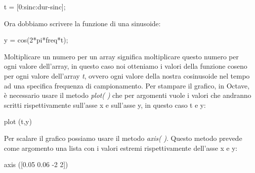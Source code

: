 \documentclass[11pt]{article}
\begin{document}
\begin{multicols*}{2}
\begin{center}
\begin{minipage}[c]{4cm}
\begin{sffamily}

t = [0:sinc:dur-sinc]; %

\end{sffamily}
\end{minipage}
\end{center}

\noindent Ora dobbiamo scrivere la funzione di una sinusoide:

\begin{center}
\begin{minipage}[c]{4cm}
\begin{sffamily}

y = cos(2*pi*freq*t);

\end{sffamily}
\end{minipage}
\end{center}

\noindent Moltiplicare un numero per un array significa moltiplicare questo numero per ogni valore dell’array, in questo caso noi otteniamo i valori della funzione coseno per ogni valore dell’array \textit{t}, ovvero ogni valore della nostra cosinusoide nel tempo ad una specifica frequenza di campionamento.
Per stampare il grafico, in Octave, è necessario usare il metodo \textit{plot( )} che per argomenti vuole i valori che andranno scritti rispettivamente sull’asse x e sull’asse y, in questo caso t e y:

\begin{center}
\begin{minipage}[c]{2cm}
\begin{sffamily}

plot (t,y)

\end{sffamily}
\end{minipage}
\end{center}

\noindent Per scalare il grafico possiamo usare il metodo \textit{axis( )}. Questo metodo prevede come argomento una lista con i valori estremi rispettivamente dell’asse x e y:

\begin{center}
\begin{minipage}[c]{4cm}
\begin{sffamily}

axis ([0.05 0.06 -2 2]) \\


\end{sffamily}
\end{minipage}
\end{center}
\end{multicols*}
\end{document}
